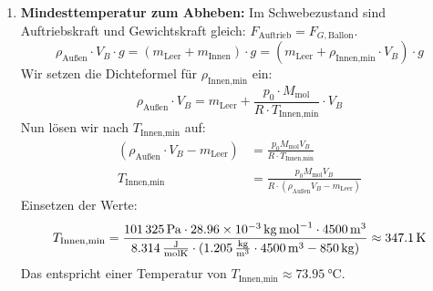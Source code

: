 \documentclass[ngerman]{scrreprt}
\newenvironment{loesungbox}[1]
  {\needspace{5\baselineskip}\begin{loesungboxstyle}[frametitle={#1}]}
  {\end{loesungboxstyle}}
\begin{document}
\begin{loesungbox}{Lösung zu \Cref{aufg:ballonfahrt}}
\begin{enumerate}
    \item \textbf{Mindesttemperatur zum Abheben:}
    Im Schwebezustand sind Auftriebskraft und Gewichtskraft gleich: $F_{\text{Auftrieb}} = F_{G, \text{Ballon}}$.
    \begin{equation}
        \rho_{\text{Außen}} \cdot V_B \cdot g = (m_{\text{Leer}} + m_{\text{Innen}}) \cdot g = (m_{\text{Leer}} + \rho_{\text{Innen,min}} \cdot V_B) \cdot g
    \end{equation}
    Wir setzen die Dichteformel  für $\rho_{\text{Innen,min}}$ ein:
    \begin{equation}
        \rho_{\text{Außen}} \cdot V_B = m_{\text{Leer}} + \frac{p_0 \cdot M_{\text{mol}}}{R \cdot T_{\text{Innen,min}}} \cdot V_B
    \end{equation}
    Nun lösen wir nach $T_{\text{Innen,min}}$ auf:
    \begin{align}
        (\rho_{\text{Außen}} \cdot V_B - m_{\text{Leer}}) &= \frac{p_0 M_{\text{mol}} V_B}{R \cdot T_{\text{Innen,min}}} \\
        T_{\text{Innen,min}} &= \frac{p_0 M_{\text{mol}} V_B}{R \cdot (\rho_{\text{Außen}} V_B - m_{\text{Leer}})}
    \end{align}
    Einsetzen der Werte:
    \begin{equation}
        T_{\text{Innen,min}} = \frac{\SI{101325}{\pascal} \cdot \SI{28.96e-3}{\kilo\gram\per\mol} \cdot \SI{4500}{\meter\cubed}}{\SI{8.314}{\frac{\joule}{\mol\kelvin}} \cdot (\SI{1.205}{\frac{\kilo\gram}{\meter\cubed}} \cdot \SI{4500}{\meter\cubed} - \SI{850}{\kilo\gram})} \approx \SI{347.1}{\kelvin}
    \end{equation}
    Das entspricht einer Temperatur von $T_{\text{Innen,min}} \approx \SI{73.95}{\celsius}$.


\end{enumerate}
\end{loesungbox}
\end{document}
